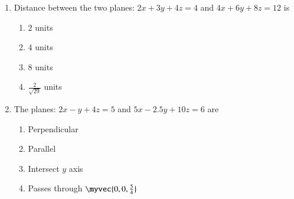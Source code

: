 \documentclass{article}
\theoremstyle{remark}
\begin{document}
\begin{enumerate}[resume]
\item Distance between the two planes: $2x+3y+4z=4$ and $4x+6y+8z=12$ is \label{prob:22}
\begin{enumerate}
\item $2$ units
\item $4$ units
\item $8$ units
\item $\frac{2}{\sqrt{29}}$ units
\end{enumerate}
\item The planes: $2x-y+4z=5$ and $5x-2.5y+10z=6$ are \label{prob:23}
\begin{enumerate}
\item Perpendicular
\item Parallel
\item Intersect $y$ axis
\item Passes through $\myvec{0,0,\frac{5}{4}}$
\end{enumerate}
\end{enumerate}
\end{document}

